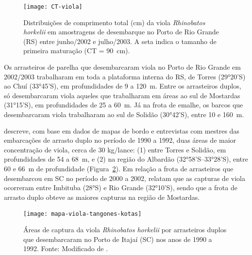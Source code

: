 \documentclass[a4paper,11pt,twoside,showtrims,onecolumn,openright,final]{memoir}
\begin{document}
\begin{figure}
\begin{center}
\texttt{[image: CT-viola]}
\end{center}
\caption[Distribuições de comprimento total da viola \emph{Rhinobatos horkelii}]
        {Distribuições de comprimento total (cm) da viola \emph{Rhinobatos horkelii} 
         em amostragens de desembarque no Porto de Rio Grande (RS) entre junho/2002 e julho/2003.
	 A seta indica o tamanho de primeira maturação (CT = 90~cm).}
\label{fig:ct-viola}
\end{figure}


Os arrasteiros de parelha que desembarcaram viola no Porto de Rio Grande em 2002/2003 trabalharam em 
toda a plataforma interna do RS, de Torres (29°20'S) ao Chuí (33°45'S), em profundidades de 9 a 120~m. 
Entre os arrasteiros duplos, só desembarcaram viola aqueles que trabalharam em áreas ao sul 
de Mostardas (31°15'S), em profundidades de 25 a 60~m. Já na frota de emalhe, os barcos que 
desembarcaram viola trabalharam ao sul de Solidão (30°42'S), entre 10 e 160~m. 

\citet{kotas1998} descreve, com base em dados de mapas de bordo e entrevistas com mestres das embarcações 
de arrasto duplo no período de 1990 a 1992, duas áreas de maior concentração de viola, 
cerca de 30 kg/lance: (1) entre Torres e Solidão, em profundidades de 54 a 68~m, e (2) 
na região do Albardão (32°58'S--33°28'S), entre 60 e 66~m de profundidade (Figura~\ref{fig:mapakotas-viola}). 
Em relação a frota de arrasteiros que desembarcou em SC no período de 2000 a 2002, \citet{martins2003}
relatam que as capturas de viola ocorreram entre Imbituba (28°S) e Rio Grande (32°10'S), sendo 
que a frota de arrasto duplo obteve as maiores capturas na região de Mostardas. 

%
%

\begin{figure}
\begin{center}
\texttt{[image: mapa-viola-tangones-kotas]}
\end{center}
\caption[Áreas de captura da viola \emph{Rhinobatos horkelii} por arrasteiros duplos que desembarcaram no 
         Porto de Itajaí (SC) nos anos de 1990 a 1992.]
        {Áreas de captura da viola \emph{Rhinobatos horkelii} por arrasteiros duplos que desembarcaram no 
         Porto de Itajaí (SC) nos anos de 1990 a 1992. Fonte: Modificado de \citet{kotas1998}.}
\label{fig:mapakotas-viola}
\end{figure}
\end{document}

